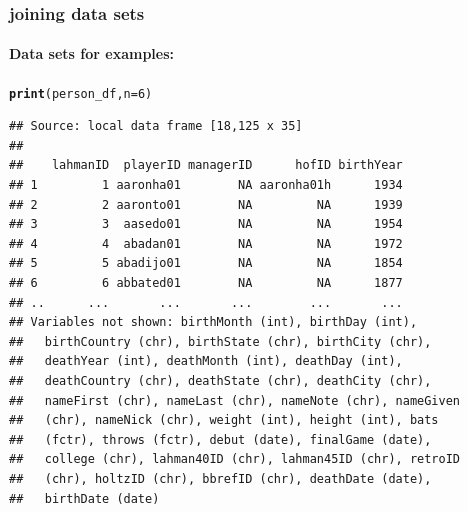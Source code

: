 \documentclass{beamer}\usepackage[]{graphicx}\usepackage[]{color}
\makeatletter
\newcommand{\hlnum}[1]{\textcolor[rgb]{0.686,0.059,0.569}{#1}}%
\newcommand{\hlstd}[1]{\textcolor[rgb]{0.345,0.345,0.345}{#1}}%
\newcommand{\hlkwc}[1]{\textcolor[rgb]{0.333,0.667,0.333}{#1}}%
\newcommand{\hlkwd}[1]{\textcolor[rgb]{0.737,0.353,0.396}{\textbf{#1}}}%
\newenvironment{kframe}{%
 \def\at@end@of@kframe{}%
 \ifinner\ifhmode%
  \def\at@end@of@kframe{\end{minipage}}%
  \begin{minipage}{\columnwidth}%
 \fi\fi%
 \def\FrameCommand##1{\hskip\@totalleftmargin \hskip-\fboxsep
 \colorbox{shadecolor}{##1}\hskip-\fboxsep
     \hskip-\linewidth \hskip-\@totalleftmargin \hskip\columnwidth}%
 \MakeFramed {\advance\hsize-\width
   \@totalleftmargin\z@ \linewidth\hsize
   \@setminipage}}%
 {\par\unskip\endMakeFramed%
 \at@end@of@kframe}
\newenvironment{knitrout}{}{} %
\makeatother
\begin{document}
\begin{frame}[fragile]
  \frametitle{joining data sets} 
  \framesubtitle{Data sets for examples:}
\begin{knitrout}\footnotesize
{}\color{fgcolor}\begin{kframe}
\begin{alltt}
\hlkwd{print}\hlstd{(person_df,}   \hlkwc{n} \hlstd{=} \hlnum{6}\hlstd{)}
\end{alltt}
\begin{verbatim}
## Source: local data frame [18,125 x 35]
## 
##    lahmanID  playerID managerID      hofID birthYear
## 1         1 aaronha01        NA aaronha01h      1934
## 2         2 aaronto01        NA         NA      1939
## 3         3  aasedo01        NA         NA      1954
## 4         4  abadan01        NA         NA      1972
## 5         5 abadijo01        NA         NA      1854
## 6         6 abbated01        NA         NA      1877
## ..      ...       ...       ...        ...       ...
## Variables not shown: birthMonth (int), birthDay (int),
##   birthCountry (chr), birthState (chr), birthCity (chr),
##   deathYear (int), deathMonth (int), deathDay (int),
##   deathCountry (chr), deathState (chr), deathCity (chr),
##   nameFirst (chr), nameLast (chr), nameNote (chr), nameGiven
##   (chr), nameNick (chr), weight (int), height (int), bats
##   (fctr), throws (fctr), debut (date), finalGame (date),
##   college (chr), lahman40ID (chr), lahman45ID (chr), retroID
##   (chr), holtzID (chr), bbrefID (chr), deathDate (date),
##   birthDate (date)
\end{verbatim}
\end{kframe}
\end{knitrout}
\end{frame} 
\end{document}
